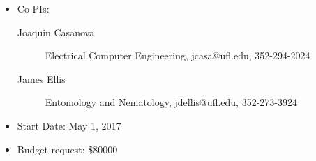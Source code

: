 
\begin{itemize}
\item Co-PIs:
\begin{description}
\item[Joaquin Casanova] Electrical Computer Engineering, jcasa@ufl.edu, 352-294-2024
\item[James Ellis] Entomology and Nematology, jdellis@ufl.edu, 352-273-3924
\end{description}
\item Start Date: May 1, 2017
\item Budget request: \$80000
\end{itemize}
